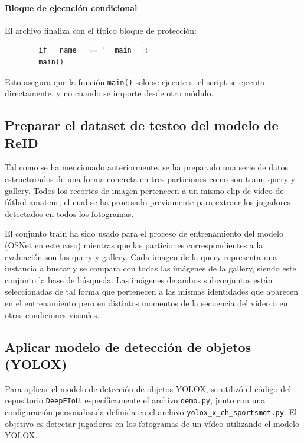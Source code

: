 \documentclass[12pt, a4paper, twoside]{article}
\begin{document}
	\paragraph{Bloque de ejecución condicional}
	
	El archivo finaliza con el típico bloque de protección:
	
	\begin{verbatim}
		if __name__ == '__main__':
		main()
	\end{verbatim}
	
	Esto asegura que la función \texttt{main()} solo se ejecute si el script se ejecuta directamente, y no cuando se importe desde otro módulo.
	
	
	
	\subsection{Preparar el dataset de testeo del modelo de ReID}
	
	Tal como se ha mencionado anteriormente, se ha preparado una serie de datos estructurados de una forma concreta en tres particiones como son train, query y gallery. Todos los recortes de imagen pertenecen a un mismo clip de vídeo de fútbol amateur, el cual se ha procesado previamente para extraer los jugadores detectados en todos los fotogramas.
	
	El conjunto train ha sido usado para el proceso de entrenamiento del modelo (OSNet en este caso) mientras que las particiones correspondientes a la evaluación son las query y gallery. Cada imagen de la query representa una instancia a buscar y se compara con todas las imágenes de la gallery, siendo este conjunto la base de búsqueda. Las imágenes de ambos subconjuntos están seleccionadas de tal forma que pertenecen a las mismas identidades que aparecen en el entrenamiento pero en distintos momentos de la secuencia del vídeo o en otras condiciones visuales.
	
	
	
	
	\subsection{Aplicar modelo de detección de objetos (YOLOX)}
	
	Para aplicar el modelo de detección de objetos YOLOX, se utilizó el código del repositorio \texttt{DeepEIoU}, específicamente el archivo \texttt{demo.py}, junto con una configuración personalizada definida en el archivo \texttt{yolox\_x\_ch\_sportsmot.py}. El objetivo es detectar jugadores en los fotogramas de un vídeo utilizando el modelo YOLOX.
	
\end{document}
